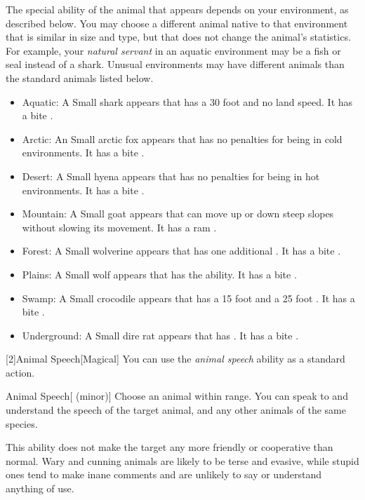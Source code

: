         The special ability of the animal that appears depends on your environment, as described below.
        You may choose a different animal native to that environment that is similar in size and type, but that does not change the animal's statistics.
        For example, your \textit{natural servant} in an aquatic environment may be a fish or seal instead of a shark.
        Unusual environments may have different animals than the standard animals listed below.
        \begin{itemize}
            \item Aquatic: A Small shark appears that has a 30 foot  and no land speed.
                It has a bite .
            \item Arctic: An Small arctic fox appears that has no penalties for being in cold environments.
                It has a bite .
            \item Desert: A Small hyena appears that has no penalties for being in hot environments.
                It has a bite .
            \item Mountain: A Small goat appears that can move up or down steep slopes without slowing its movement.
                It has a ram .
            \item Forest: A Small wolverine appears that has one additional .
                It has a bite .
            \item Plains: A Small wolf appears that has the  ability.
                It has a bite .
            \item Swamp: A Small crocodile appears that has a 15 foot  and a 25 foot .
                It has a bite .
            \item Underground: A Small dire rat appears that has .
                It has a bite .
        \end{itemize}

        [2]{Animal Speech}[Magical] You can use the \textit{animal speech} ability as a standard action.
        \begin{attuneability}{Animal Speech}[ (minor)]
            Choose an animal within \rnglong range.
            You can speak to and understand the speech of the target animal, and any other animals of the same species.

            This ability does not make the target any more friendly or cooperative than normal.
            Wary and cunning animals are likely to be terse and evasive, while stupid ones tend to make inane comments and are unlikely to say or understand anything of use.
        \end{attuneability}

